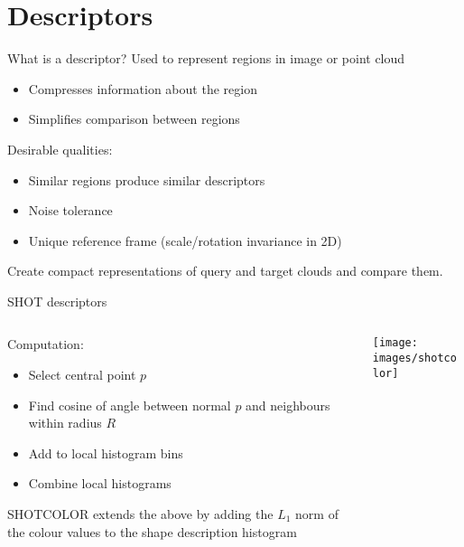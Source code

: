 \documentclass{beamer}
\begin{document}
\section{Descriptors}
\begin{frame}{What is a descriptor?}
  Used to represent regions in image or point cloud
  \begin{itemize}
  \item Compresses information about the region
  \item Simplifies comparison between regions
  \end{itemize}
  Desirable qualities:
  \begin{itemize}
  \item Similar regions produce similar descriptors
  \item Noise tolerance
  \item Unique reference frame (scale/rotation invariance in 2D)
  \end{itemize}
  Create compact representations of query and target clouds and compare them.
\end{frame}
\begin{frame}{SHOT descriptors}

  \begin{columns}
    \begin{column}{0.5\textwidth}
      Computation:
      \begin{itemize}
      \item Select central point $p$
      \item Find cosine of angle between normal $p$ and neighbours within radius
        $R$
      \item Add to local histogram bins
      \item Combine local histograms
      \end{itemize}
      SHOTCOLOR extends the above by adding the $L_1$ norm of the colour values
      to the shape description histogram
    \end{column}
    \begin{column}{0.5\textwidth}
      \texttt{[image: images/shotcolor]}
    \end{column}
  \end{columns}
\end{frame}
\end{document}
